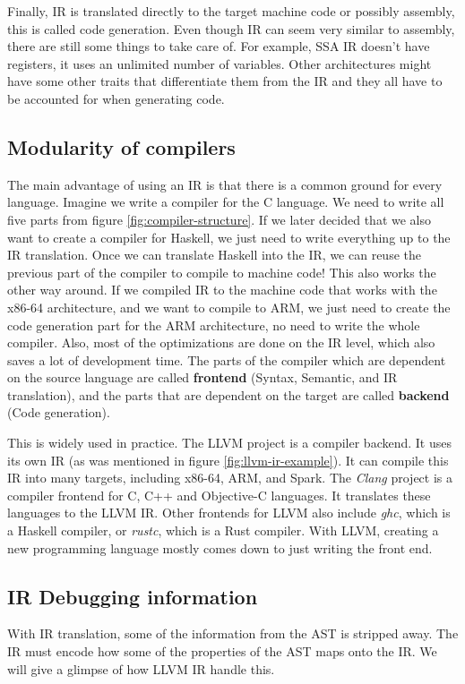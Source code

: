 Finally, IR is translated directly to the target machine code or possibly
assembly, this is called code generation. Even though IR can seem very similar
to assembly, there are still some things to take care of. For example, SSA IR
doesn't have registers, it uses an unlimited number of variables. Other
architectures might have some other traits that differentiate them from the IR
and they all have to be accounted for when generating code.

\subsection{Modularity of compilers}
The main advantage of using an IR is that there is a common ground for every
language. Imagine we write a compiler for the C language. We need to write all
five parts from figure \ref{fig:compiler-structure}. If we later decided that
we also want to create a compiler for Haskell, we just need to write everything
up to the IR translation. Once we can translate Haskell into the IR, we can
reuse the previous part of the compiler to compile to machine code! This also
works the other way around. If we compiled IR to the machine code that works
with the x86-64 architecture, and we want to compile to ARM, we just need to
create the code generation part for the ARM architecture, no need to write the
whole compiler. Also, most of the optimizations are done on the IR level, which
also saves a lot of development time. The parts of the compiler which are
dependent on the source language are called \textbf{frontend} (Syntax,
Semantic, and IR translation), and the parts that are dependent on the target
are called \textbf{backend} (Code generation).

This is widely used in practice. The LLVM \cite{llvm} project is a compiler
backend. It uses its own IR (as was mentioned in figure
\ref{fig:llvm-ir-example}). It can compile this IR into many targets, including
x86-64, ARM, and Spark. The \textit{Clang} project is a compiler frontend for
C, C++ and Objective-C languages. It translates these languages to the LLVM IR.
Other frontends for LLVM also include \textit{ghc}, which is a Haskell
compiler, or \textit{rustc}, which is a Rust compiler. With LLVM, creating a
new programming language mostly comes down to just writing the front end.

\subsection{IR Debugging information}
With IR translation, some of the information from the AST is stripped away.
The IR must encode how some of the properties of the AST maps onto the IR.
We will give a glimpse of how LLVM IR handle this.

